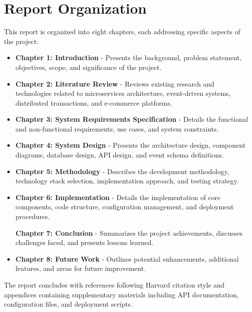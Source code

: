 \section{Report Organization}

This report is organized into eight chapters, each addressing specific aspects of the project:

\begin{itemize}
    \item \textbf{Chapter 1: Introduction} - Presents the background, problem statement, objectives, scope, and significance of the project.
    
    \item \textbf{Chapter 2: Literature Review} - Reviews existing research and technologies related to microservices architecture, event-driven systems, distributed transactions, and e-commerce platforms.
    
    \item \textbf{Chapter 3: System Requirements Specification} - Details the functional and non-functional requirements, use cases, and system constraints.
    
    \item \textbf{Chapter 4: System Design} - Presents the architecture design, component diagrams, database design, API design, and event schema definitions.
    
    \item \textbf{Chapter 5: Methodology} - Describes the development methodology, technology stack selection, implementation approach, and testing strategy.
    
    \item \textbf{Chapter 6: Implementation} - Details the implementation of core components, code structure, configuration management, and deployment procedures.
    
    \textbf{Chapter 7: Conclusion} - Summarizes the project achievements, discusses challenges faced, and presents lessons learned.
    
    \item \textbf{Chapter 8: Future Work} - Outlines potential enhancements, additional features, and areas for future improvement.
\end{itemize}

The report concludes with references following Harvard citation style and appendices containing supplementary materials including API documentation, configuration files, and deployment scripts.
